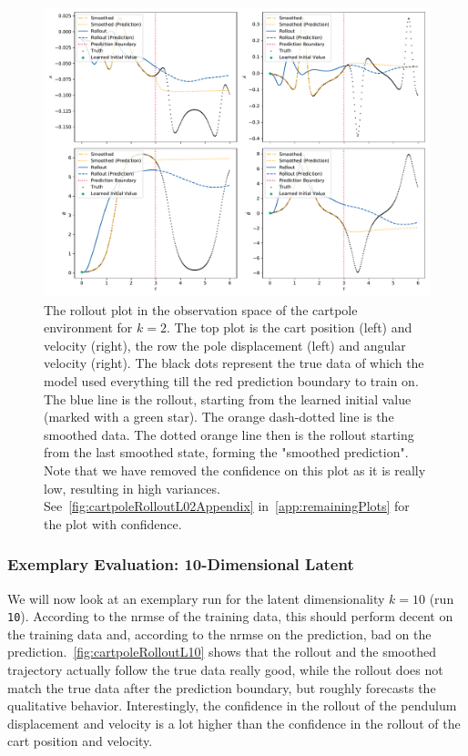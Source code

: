 			\begin{figure}
				\centering
				\includegraphics[width=\linewidth]{figures/results/cartpole-gym/run-latent-dim-02/without-confidence/rollout-observations-N0.pdf}
				\caption{The rollout plot in the observation space of the cartpole environment for \(k = 2\). The top plot is the cart position (left) and velocity (right), the row the pole displacement (left) and angular velocity (right). The black dots represent the true data of which the model used everything till the red prediction boundary to train on. The blue line is the rollout, starting from the learned initial value (marked with a green star). The orange dash-dotted line is the smoothed data. The dotted orange line then is the rollout starting from the last smoothed state, forming the "smoothed prediction". Note that we have removed the confidence on this plot as it is really low, resulting in high variances. See~\autoref{fig:cartpoleRolloutL02Appendix} in~\autoref{app:remainingPlots} for the plot with confidence.}
				\label{fig:cartpoleRolloutL02}
			\end{figure}

		\subsubsection{Exemplary Evaluation: 10-Dimensional Latent}
			\label{subsubsec:cartpoleL10}

			We will now look at an exemplary run for the latent dimensionality \( k = 10 \) (run \texttt{10}). According to the \ac{nrmse} of the training data, this should perform decent on the training data and, according to the \ac{nrmse} on the prediction, bad on the prediction.~\autoref{fig:cartpoleRolloutL10} shows that the rollout and the smoothed trajectory actually follow the true data really good, while the rollout does not match the true data after the prediction boundary, but roughly forecasts the qualitative behavior. Interestingly, the confidence in the rollout of the pendulum displacement and velocity is a lot higher than the confidence in the rollout of the cart position and velocity.


